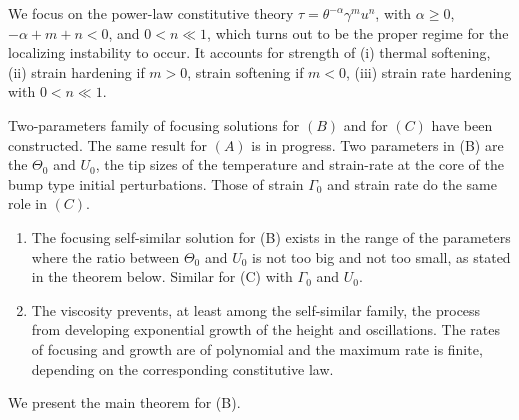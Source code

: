 \documentclass[a4paper,11pt]{article}
\begin{document}
We focus on the power-law constitutive theory $\tau = \theta^{-\alpha}\gamma^m u^n$, with $\alpha\ge0$, $-\alpha+m+n<0$, and $0<n\ll1$, which turns out to be the proper regime for the localizing instability to occur. It accounts for strength of (i) thermal softening, (ii) strain hardening if $m>0$, strain softening if $m<0$, (iii) strain rate hardening with $0<n\ll1$.

Two-parameters family of focusing solutions for $(B)$ and for $(C)$ have been constructed. The same result for $(A)$ is in progress. Two parameters in (B) are the $\Theta_0$ and $U_0$, the tip sizes of the temperature and strain-rate at the core of the bump type initial perturbations. Those of strain $\Gamma_0$ and strain rate do the same role in $(C)$.
\begin{enumerate}
 \item The focusing self-similar solution for (B) exists in the range of the parameters where the ratio between $\Theta_0$ and $U_0$  is not too big and not too small, as stated in the theorem below. Similar for (C) with $\Gamma_0$ and $U_0$.
 \item The viscosity prevents, at least among the self-similar family, the process from developing exponential growth of the height and oscillations. The rates of focusing and growth are of polynomial and the maximum rate is finite, depending on the corresponding constitutive law.
\end{enumerate}
We present the main theorem for (B).
\end{document}
